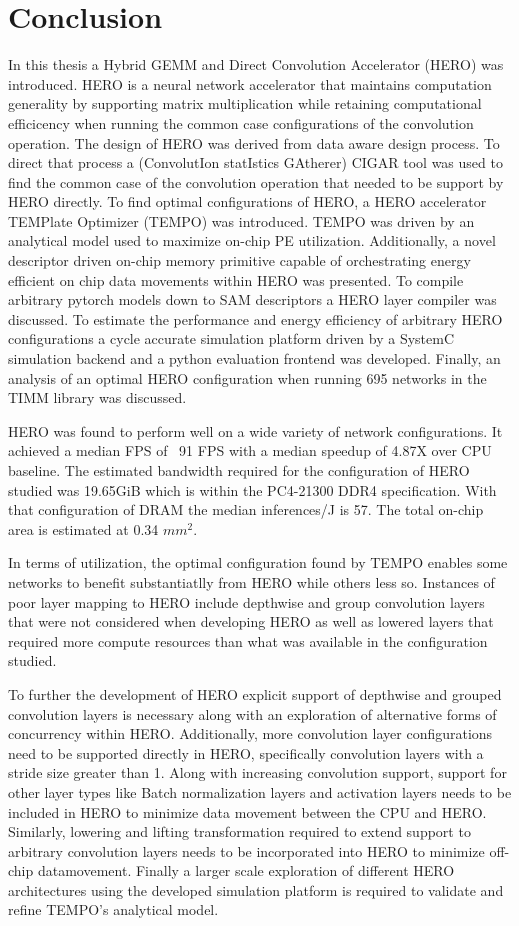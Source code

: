 \chapter{Conclusion}
\label{chap:conclude}

In this thesis a Hybrid GEMM and Direct Convolution Accelerator (HERO) was
introduced. HERO is a neural network accelerator that maintains computation
generality by supporting matrix multiplication while retaining computational
efficicency when running the common case configurations of the convolution
operation. The design of HERO was derived from data aware design process. To
direct that process a (ConvolutIon statIstics GAtherer) \ac{CIGAR} tool was used
to find the common case of the convolution operation that needed to be support
by HERO directly. To find optimal configurations of HERO, a HERO accelerator
TEMPlate Optimizer (TEMPO) was introduced. TEMPO was driven by an analytical
model used to maximize on-chip PE utilization. Additionally, a novel descriptor
driven on-chip memory primitive capable of orchestrating energy efficient on
chip data movements within \ac{HERO} was presented. To compile arbitrary pytorch
models down to SAM descriptors a HERO layer compiler was discussed. To estimate
the performance and energy efficiency of arbitrary HERO configurations a cycle
accurate simulation platform driven by a SystemC simulation backend and a python
evaluation frontend was developed. Finally, an analysis of an optimal HERO
configuration when running 695 networks in the TIMM library was discussed.

HERO was found to perform well on a wide variety of network configurations. It
achieved a median FPS of ~91 FPS with a median speedup of 4.87X over CPU
baseline. The estimated bandwidth required for the configuration of HERO studied
was 19.65GiB which is within the PC4-21300 DDR4 specification. With that
configuration of DRAM the median inferences/J is 57. The total on-chip area is
estimated at 0.34 $mm^2$. 

In terms of utilization, the optimal configuration found by TEMPO enables some
networks to benefit substantiatlly from HERO while others less so. Instances of
poor layer mapping to HERO include depthwise and group convolution layers that
were not considered when developing HERO as well as lowered layers that required more
compute resources than what was available in the configuration studied. 

To further the development of HERO explicit support of depthwise and grouped
convolution layers is necessary along with an exploration of alternative forms
of concurrency within HERO. Additionally, more convolution layer configurations
need to be supported directly in HERO, specifically convolution layers with a
stride size greater than 1. Along with increasing convolution support, support
for other layer types like Batch normalization layers and activation layers
needs to be included in HERO to minimize data movement between the CPU and HERO.
Similarly, lowering and lifting transformation required to extend support to
arbitrary convolution layers needs to be incorporated into HERO to minimize
off-chip datamovement. Finally a larger scale exploration of different HERO
architectures using the developed simulation platform is required to validate
and refine TEMPO's analytical model.